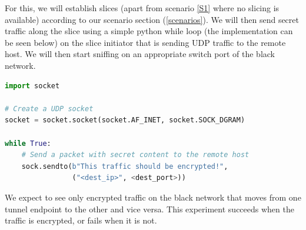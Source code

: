 \begin{description}[style=multiline, labelwidth=0.7cm]
    For this, we will establish slices (apart from scenario \ref{S1} where no slicing is available) according to our scenario section (\ref{scenarios}). We will then send secret traffic along the slice using a simple python while loop (the implementation can be seen below) on the slice initiator that is sending UDP traffic to the remote host. We will then start sniffing on an appropriate switch port of the black network.

\begin{lstlisting}[language=python]
import socket

# Create a UDP socket
socket = socket.socket(socket.AF_INET, socket.SOCK_DGRAM)

while True:
    # Send a packet with secret content to the remote host
    sock.sendto(b"This traffic should be encrypted!",
                ("<dest_ip>", <dest_port>))
\end{lstlisting}

    We expect to see only encrypted traffic on the black network that moves from one tunnel endpoint to the other and vice versa. This experiment succeeds when the traffic is encrypted, or fails when it is not.






\end{description}

